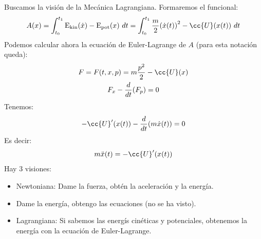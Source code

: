 \noindent
Buscamos la visión de la Mecánica Lagrangiana. Formaremos el funcional:
\begin{equation*}
    A(x) = \int_{t_0}^{t_1} \Ekin(\dot{x}) - \Epot(x)~dt  = \int_{t_0}^{t_1} \frac{m}{2}{(\dot{x}(t))}^{2}-\cc{U}(x(t))~dt 
\end{equation*}
Podemos calcular ahora la ecuación de Euler-Lagrange de $A$ (para esta notación queda):
\begin{gather*}
    F = F(t,x,p) = m\frac{p^2}{2} - \cc{U}(x) \\
    F_x - \frac{d}{dt}(F_p) = 0
\end{gather*}
Tenemos:
\begin{equation*}
    -\cc{U}'(x(t)) - \frac{d}{dt}(m\dot{x}(t)) = 0
\end{equation*}
Es decir:
\begin{equation*}
    m\ddot{x}(t) = -\cc{U}'(x(t))
\end{equation*}
Hay 3 visiones:
\begin{itemize}
    \item Newtoniana: Dame la fuerza, obtén la aceleración y la energía.
    \item Dame la energía, obtengo las ecuaciones (no se ha visto).
    \item Lagrangiana: Si sabemos las energís cinéticas y potenciales, obtenemos la energía con la ecuación de Euler-Lagrange.
\end{itemize}

